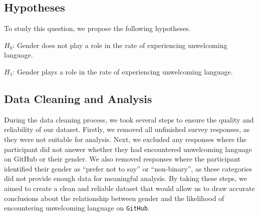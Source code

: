 \documentclass[journal,12pt,onecolumn,]{IEEEtran}
\begin{document}
\subsection{Hypotheses}
To study this question, we propose the following hypotheses.

$H_0$: Gender does not play a role in the rate of experiencing unwelcoming language.

$H_1$: Gender plays a role in the rate of experiencing unwelcoming language.
\subsection{Data Cleaning and Analysis}
During the data cleaning process, we took several steps to ensure the quality and reliability of our dataset. 
Firstly, we removed all unfinished survey responses, as they were not suitable for analysis. 
Next, we excluded any responses where the participant did not answer whether they had encountered unwelcoming language on GitHub or their gender. 
We also removed responses where the participant identified their gender as ``prefer not to say'' or ``non-binary'', as these categories did not provide enough data for meaningful analysis. 
By taking these steps, we aimed to create a clean and reliable dataset that would allow us to draw accurate conclusions about the relationship between gender and the likelihood of encountering unwelcoming language on \texttt{GitHub}.
\end{document}
